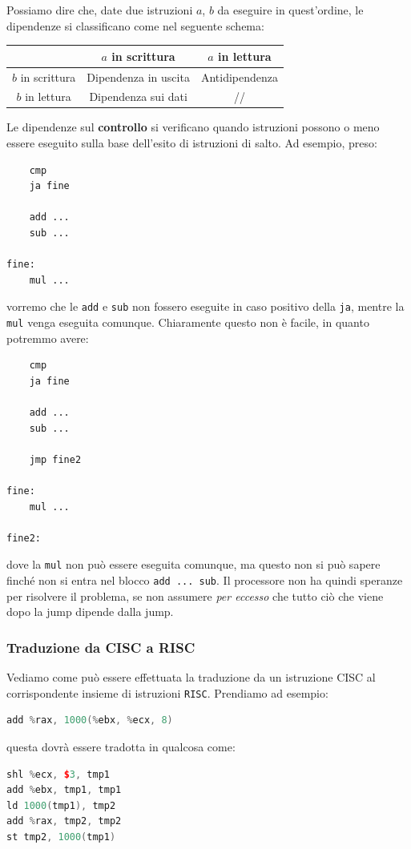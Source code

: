 \documentclass[a4paper,11pt]{article}
\begin{document}
Possiamo dire che, date due istruzioni $a$, $b$ da eseguire in quest'ordine, le dipendenze si classificano come nel seguente schema:

\begin{table}[h!]
	\center
	\begin{tabular} { c | c  c  }
		& $a$ in scrittura & $a$ in lettura \\ 
		\hline
		$b$ in scrittura & Dipendenza in uscita & Antidipendenza \\ 
		$b$ in lettura & Dipendenza sui dati & // 
	\end{tabular}
\end{table}

Le dipendenze sul \textbf{controllo} si verificano quando istruzioni possono o meno essere eseguito sulla base dell'esito di istruzioni di salto.
Ad esempio, preso:
\begin{lstlisting}	
	cmp
	ja fine

	add ...
	sub ...

fine:
	mul ...
\end{lstlisting}
vorremo che le \lstinline|add| e \lstinline|sub| non fossero eseguite in caso positivo della \lstinline|ja|, mentre la \lstinline|mul| venga eseguita comunque.
Chiaramente questo non è facile, in quanto potremmo avere:
\begin{lstlisting}	
	cmp
	ja fine

	add ...
	sub ...

	jmp fine2

fine:
	mul ...

fine2:
\end{lstlisting}
dove la \lstinline|mul| non può essere eseguita comunque, ma questo non si può sapere finché non si entra nel blocco \lstinline|add ... sub|.
Il processore non ha quindi speranze per risolvere il problema, se non assumere \textit{per eccesso} che tutto ciò che viene dopo la jump dipende dalla jump. 

\subsubsection{Traduzione da CISC a RISC}
Vediamo come può essere effettuata la traduzione da un istruzione CISC al corrispondente insieme di istruzioni \lstinline|RISC|.
Prendiamo ad esempio:
\begin{lstlisting}[language=C++, style=codestyle]	
add %rax, 1000(%ebx, %ecx, 8)
\end{lstlisting}
questa dovrà essere tradotta in qualcosa come:
\begin{lstlisting}[language=C++, style=codestyle]	
shl %ecx, $3, tmp1
add %ebx, tmp1, tmp1
ld 1000(tmp1), tmp2
add %rax, tmp2, tmp2
st tmp2, 1000(tmp1)
\end{lstlisting}
\end{document}
